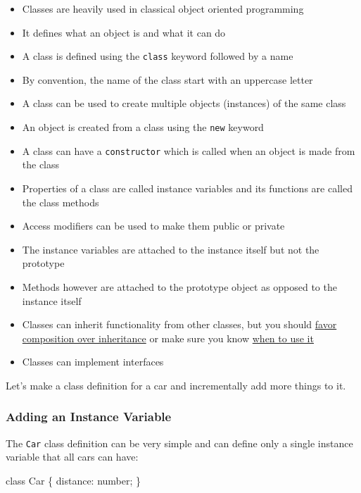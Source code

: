 \documentclass[12pt,]{article}
\newenvironment{Shaded}{}{}
\newcommand{\KeywordTok}[1]{\textcolor[rgb]{0.00,0.00,1.00}{{#1}}}
\newcommand{\NormalTok}[1]{{#1}}
\providecommand{\tightlist}{%
  \setlength{\itemsep}{0pt}\setlength{\parskip}{0pt}}
\begin{document}
\begin{itemize}
\tightlist
\item
  Classes are heavily used in classical object oriented programming
\item
  It defines what an object is and what it can do
\item
  A class is defined using the \texttt{class} keyword followed by a name
\item
  By convention, the name of the class start with an uppercase letter
\item
  A class can be used to create multiple objects (instances) of the same
  class
\item
  An object is created from a class using the \texttt{new} keyword
\item
  A class can have a \texttt{constructor} which is called when an object
  is made from the class
\item
  Properties of a class are called instance variables and its functions
  are called the class methods
\item
  Access modifiers can be used to make them public or private
\item
  The instance variables are attached to the instance itself but not the
  prototype
\item
  Methods however are attached to the prototype object as opposed to the
  instance itself
\item
  Classes can inherit functionality from other classes, but you should
  \href{https://medium.com/javascript-scene/the-two-pillars-of-javascript-ee6f3281e7f3\#.oc5pdevwh}{favor
  composition over inheritance} or make sure you know
  \href{https://medium.com/@dtinth/es6-class-classical-inheritance-20f4726f4c4\#.xdif2m42e}{when
  to use it}
\item
  Classes can implement interfaces
\end{itemize}

Let's make a class definition for a car and incrementally add more
things to it.

\subsubsection{Adding an Instance
Variable}\label{adding-an-instance-variable}

The \texttt{Car} class definition can be very simple and can define only
a single instance variable that all cars can have:

\begin{Shaded}
\begin{Highlighting}[numbers=left,,]
\KeywordTok{class} \NormalTok{Car \{}
  \NormalTok{distance: number;}
\NormalTok{\}}
\end{Highlighting}
\end{Shaded}
\end{document}
